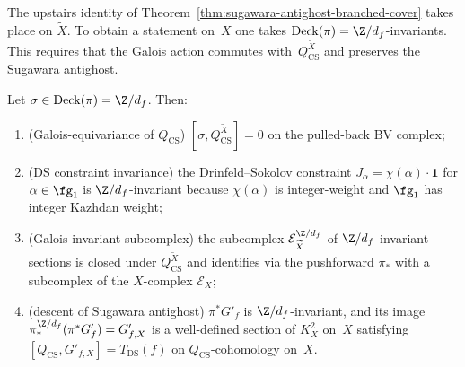 The upstairs identity of
Theorem~\ref{thm:sugawara-antighost-branched-cover} takes place on
$\widetilde X$. To obtain a statement on~$X$ one takes
$\mathrm{Deck}(\pi) = \Z/d_{f}$-invariants. This requires that the
Galois action commutes with~$Q_{\mathrm{CS}}^{\widetilde X}$ and
preserves the Sugawara antighost.

\begin{theorem}
\label{thm:galois-invariance-descent}
Let $\sigma \in \mathrm{Deck}(\pi) = \Z/d_{f}$. Then:
\begin{enumerate}[label=\textup{(\alph*)},nosep]
\item \textup{(Galois-equivariance of $Q_{\mathrm{CS}}$)}
      $[\sigma, Q_{\mathrm{CS}}^{\widetilde X}] = 0$ on the
      pulled-back BV complex;
\item \textup{(DS constraint invariance)} the Drinfeld--Sokolov
      constraint $J_{\alpha} = \chi(\alpha) \cdot \mathbf{1}$ for
      $\alpha \in \fg_{1}$ is $\Z/d_{f}$-invariant because
      $\chi(\alpha)$ is integer-weight and $\fg_{1}$ has integer
      Kazhdan weight;
\item \textup{(Galois-invariant subcomplex)} the subcomplex
      $\mathcal{E}^{\Z/d_{f}}_{\widetilde X}$ of $\Z/d_{f}$-invariant
      sections is closed under $Q_{\mathrm{CS}}^{\widetilde X}$ and
      identifies via the pushforward $\pi_{*}$ with a subcomplex of
      the $X$-complex $\mathcal{E}_{X}$;
\item \textup{(descent of Sugawara antighost)}
      $\pi^{*}G'_{f}$ is $\Z/d_{f}$-invariant, and its image
      $\pi_{*}^{\Z/d_{f}}(\pi^{*}G'_{f}) = G'_{f,X}$ is a
      well-defined section of $K_{X}^{2}$ on~$X$ satisfying
      $[Q_{\mathrm{CS}}, G'_{f,X}] = T_{\mathrm{DS}}(f)$ on
      $Q_{\mathrm{CS}}$-cohomology on~$X$.
\end{enumerate}
\end{theorem}

